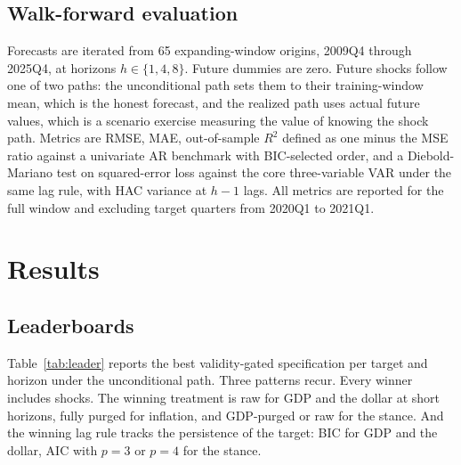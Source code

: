 \documentclass[conference]{IEEEtran}
\begin{document}
\subsection{Walk-forward evaluation}
Forecasts are iterated from 65 expanding-window origins, 2009Q4 through 2025Q4, at horizons $h \in \{1,4,8\}$. Future dummies are zero. Future shocks follow one of two paths: the unconditional path sets them to their training-window mean, which is the honest forecast, and the realized path uses actual future values, which is a scenario exercise measuring the value of knowing the shock path. Metrics are RMSE, MAE, out-of-sample $R^2$ defined as one minus the MSE ratio against a univariate AR benchmark with BIC-selected order, and a Diebold-Mariano test \cite{dm1995} on squared-error loss against the core three-variable VAR under the same lag rule, with HAC variance at $h-1$ lags. All metrics are reported for the full window and excluding target quarters from 2020Q1 to 2021Q1.

\section{Results}

\subsection{Leaderboards}
Table~\ref{tab:leader} reports the best validity-gated specification per target and horizon under the unconditional path. Three patterns recur. Every winner includes shocks. The winning treatment is raw for GDP and the dollar at short horizons, fully purged for inflation, and GDP-purged or raw for the stance. And the winning lag rule tracks the persistence of the target: BIC for GDP and the dollar, AIC with $p=3$ or $p=4$ for the stance.
\end{document}
